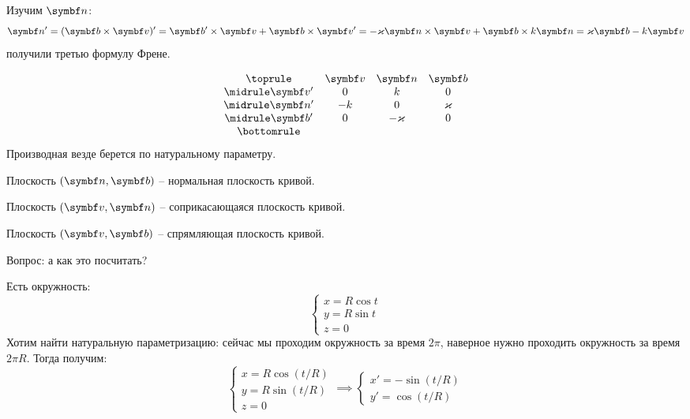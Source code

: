 \documentclass[main]{subfiles}
\begin{document}
Изучим $\vn$:
\[\vn' = (\vb \times \vv)' = \vb' \times \vv + \vb \times \vv' = -\kappa \vn \times \vv + \vb \times k\vn = \kappa\vb - k\vv\]
получили третью формулу Френе.
\begin{definition}
    \[
        \begin{array}{cccc}
            \toprule
                 & \vv & \vn     & \vb    \\ \midrule
            \vv' & 0   & k       & 0      \\ \midrule
            \vn' & -k  & 0       & \kappa \\ \midrule
            \vb' & 0   & -\kappa & 0      \\
            \bottomrule
        \end{array}
    \]
    Производная везде берется по натуральному параметру.
\end{definition}
\begin{definition}
    Плоскость $(\vn, \vb)$ -- нормальная плоскость кривой.
\end{definition}
\begin{definition}
    Плоскость $(\vv, \vn)$ -- соприкасающаяся плоскость кривой.
\end{definition}
\begin{definition}
    Плоскость $(\vv, \vb)$ -- спрямляющая плоскость кривой.
\end{definition}

Вопрос: а как это посчитать?
\begin{example}
    Есть окружность:
    \[\begin{cases}
            x = R \cos t \\
            y = R \sin t \\
            z = 0
        \end{cases}\]
    Хотим найти натуральную параметризацию:
    сейчас мы проходим окружность за время $2\pi$, наверное нужно проходить окружность за время $2\pi R$.
    Тогда получим:
    \[\begin{cases}
            x = R\cos (t/R)  \\
            y = R \sin (t/R) \\
            z = 0
        \end{cases}
        \implies
        \begin{cases}
            x' = - \sin (t/R) \\
            y' = \cos (t/R)
        \end{cases}\]
\end{example}
\end{document}
